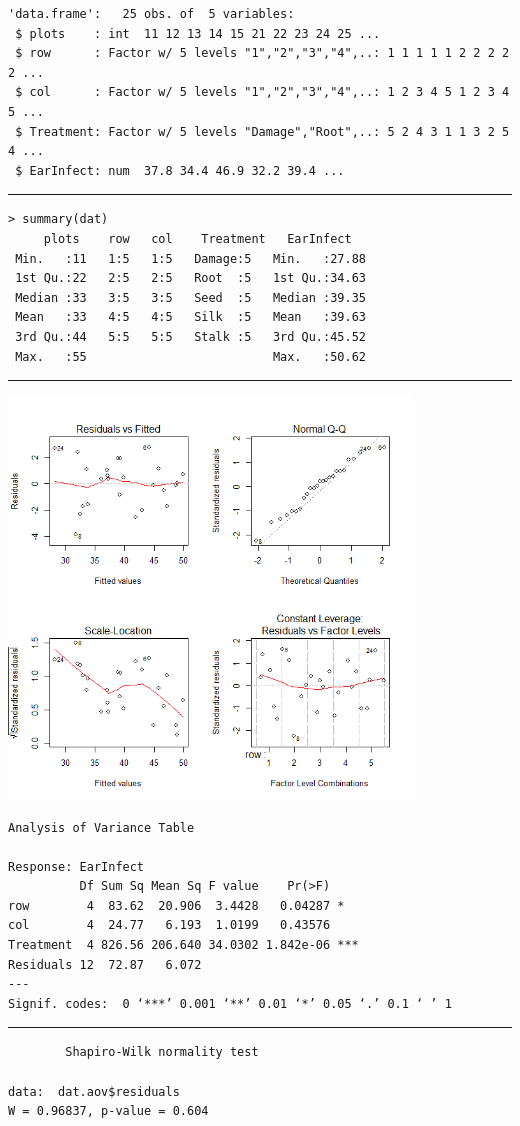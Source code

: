 \documentclass[a4paper, 10pt, fleqn, twosided]{memoir}
\begin{document}
\begin{tcolorbox}[title = Exercise 5 output continued]
\begin{verbatim}
'data.frame':   25 obs. of  5 variables:
 $ plots    : int  11 12 13 14 15 21 22 23 24 25 ...
 $ row      : Factor w/ 5 levels "1","2","3","4",..: 1 1 1 1 1 2 2 2 2 2 ...
 $ col      : Factor w/ 5 levels "1","2","3","4",..: 1 2 3 4 5 1 2 3 4 5 ...
 $ Treatment: Factor w/ 5 levels "Damage","Root",..: 5 2 4 3 1 1 3 2 5 4 ...
 $ EarInfect: num  37.8 34.4 46.9 32.2 39.4 ...
\end{verbatim}
{\color{outpt} {\hrule height 1pt}}
\begin{verbatim}
> summary(dat)
     plots    row   col    Treatment   EarInfect
 Min.   :11   1:5   1:5   Damage:5   Min.   :27.88
 1st Qu.:22   2:5   2:5   Root  :5   1st Qu.:34.63
 Median :33   3:5   3:5   Seed  :5   Median :39.35
 Mean   :33   4:5   4:5   Silk  :5   Mean   :39.63
 3rd Qu.:44   5:5   5:5   Stalk :5   3rd Qu.:45.52
 Max.   :55                          Max.   :50.62
\end{verbatim}
{\color{outpt} {\hrule height 1pt}} \vspace{0.2cm}

\includegraphics[width=0.8\textwidth, frame]{Exercise5Resplot.png}
\end{tcolorbox}

\begin{tcolorbox}[title = Exercise 5 output continued]
\begin{verbatim}
Analysis of Variance Table

Response: EarInfect
          Df Sum Sq Mean Sq F value    Pr(>F)
row        4  83.62  20.906  3.4428   0.04287 *
col        4  24.77   6.193  1.0199   0.43576
Treatment  4 826.56 206.640 34.0302 1.842e-06 ***
Residuals 12  72.87   6.072
---
Signif. codes:  0 ‘***’ 0.001 ‘**’ 0.01 ‘*’ 0.05 ‘.’ 0.1 ‘ ’ 1
\end{verbatim}
{\color{outpt} {\hrule height 1pt}}
\begin{verbatim}
        Shapiro-Wilk normality test

data:  dat.aov$residuals
W = 0.96837, p-value = 0.604
\end{verbatim}

\end{tcolorbox}
\end{document}
